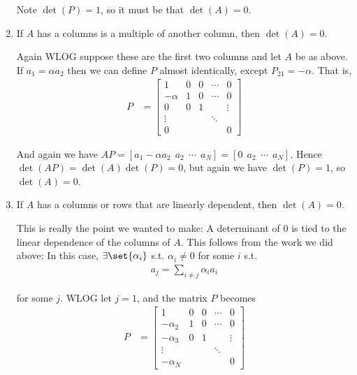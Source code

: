 \documentclass{article}
\begin{document}
\begin{enumerate}
    Note $\det(P) = 1$, so it must be that $\det(A) = 0$.

  \item If $A$ has a columns is a multiple of another column, then $\det(A) = 0$.

    Again WLOG suppose these are the first two columns and let $A$ be as above. If $a_1 = \alpha a_2$ then we can define $P$ almost identically, except $P_{21} = - \alpha$. That is,
    \begin{align*}
      P
      &
      =
      \begin{bmatrix}
        1      & 0 & 0 & \cdots & 0 \\
        -\alpha& 1 & 0 & \cdots & 0 \\
        0      & 0 & 1 &        & \vdots \\
        \vdots &   &   & \ddots &   \\
        0      &   &   &        & 0
      \end{bmatrix}
    \end{align*}

    And again we have $A P = [a_1 - \alpha a_2 ~~ a_2 ~~ \cdots ~~ a_N] = [0 ~~ a_2 ~~ \cdots ~~ a_N]$. Hence $\det(A P) = \det(A) \det(P) = 0$, but again we have $\det(P) = 1$, so $\det(A) = 0$.

  \item If $A$ has a columns or rows that are linearly dependent, then $\det(A) = 0$.

    This is really the point we wanted to make: A determinant of $0$ is tied to the linear dependence of the columns of $A$. This follows from the work we did above: In this case, $\exists \set{\alpha_i}$ s.t. $\alpha_i \ne 0$ for some $i$ s.t.
    \begin{align*}
      a_j = \sum^{}_{i \ne j} \alpha_i a_i
    \end{align*}

    for some $j$. WLOG let $j = 1$, and the matrix $P$ becomes
    \begin{align*}
      P
      &
      =
      \begin{bmatrix}
        1         & 0 & 0 & \cdots & 0 \\
        -\alpha_2 & 1 & 0 & \cdots & 0 \\
        -\alpha_3 & 0 & 1 &        & \vdots \\
        \vdots    &   &   & \ddots & \\
        -\alpha_N &   &   &        & 0
      \end{bmatrix}
    \end{align*}


\end{enumerate}
\end{document}
